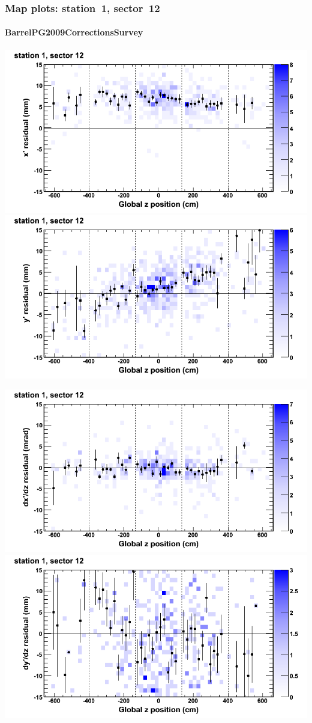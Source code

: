 \documentclass[compress]{beamer}
\begin{document}
\begin{frame}
\frametitle{Map plots: station~1, sector~12}
\framesubtitle{BarrelPG2009CorrectionsSurvey}
\includegraphics[width=0.5\linewidth]{mapplots_01/DTvsz_st1sec12_x.png}
\includegraphics[width=0.5\linewidth]{mapplots_01/DTvsz_st1sec12_y.png}

\includegraphics[width=0.5\linewidth]{mapplots_01/DTvsz_st1sec12_dxdz.png}
\includegraphics[width=0.5\linewidth]{mapplots_01/DTvsz_st1sec12_dydz.png}
\end{frame}
\end{document}
